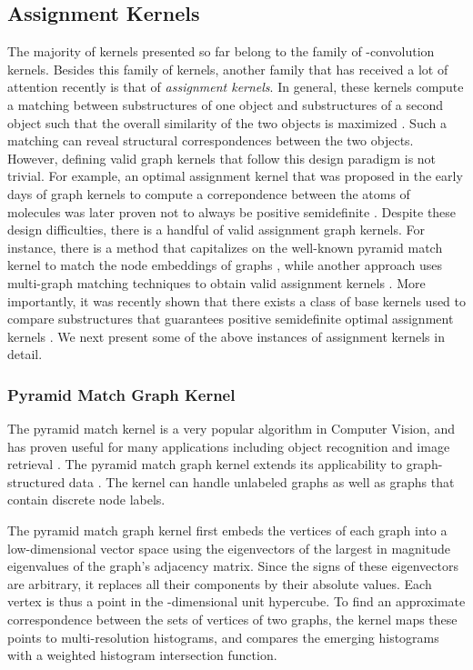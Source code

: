 \documentclass[twoside,11pt]{article}
\begin{document}
\subsection{Assignment Kernels}
The majority of kernels presented so far belong to the family of -convolution kernels.
Besides this family of kernels, another family that has received a lot of attention recently is that of \textit{assignment kernels}.
In general, these kernels compute a matching between substructures of one object and substructures of a second object such that the overall similarity of the two objects is maximized .
Such a matching can reveal structural correspondences between the two objects.
However, defining valid graph kernels that follow this design paradigm is not trivial.
For example, an optimal assignment kernel that was proposed in the early days of graph kernels to compute a correpondence between the atoms of molecules  was later proven not to always be positive semidefinite .
Despite these design difficulties, there is a handful of valid assignment graph kernels.
For instance, there is a method that capitalizes on the well-known pyramid match kernel to match the node embeddings of graphs , while another approach uses multi-graph matching techniques to obtain valid assignment kernels .
More importantly, it was recently shown that there exists a class of base kernels used to compare substructures that guarantees positive semidefinite optimal assignment kernels .
We next present some of the above instances of assignment kernels in detail.


\subsubsection{Pyramid Match Graph Kernel}
The pyramid match kernel is a very popular algorithm in Computer Vision, and has proven useful for many applications including object recognition and image retrieval .
The pyramid match graph kernel extends its applicability to graph-structured data .
The kernel can handle unlabeled graphs as well as graphs that contain discrete node labels.

The pyramid match graph kernel first embeds the vertices of each graph into a low-dimensional vector space using the eigenvectors of the  largest in magnitude eigenvalues of the graph's adjacency matrix.
Since the signs of these eigenvectors are arbitrary, it replaces all their components by their absolute values.
Each vertex is thus a point in the -dimensional unit hypercube.
To find an approximate correspondence between the sets of vertices of two graphs, the kernel maps these points to multi-resolution histograms, and compares the emerging histograms with a weighted histogram intersection function.
\end{document}
